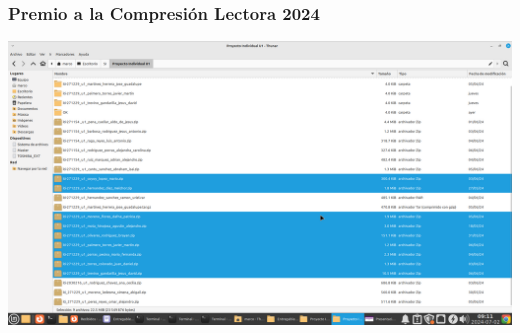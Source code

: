 \begin{frame}
\frametitle{Premio a la Compresión Lectora 2024}
\begin{center}
\includegraphics[width=0.75\linewidth]{Entregables/PremioAlaComprensionLectora_2024.png}
\end{center}

\end{frame}




